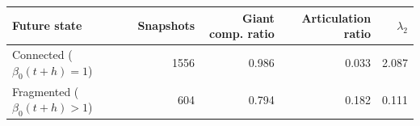 \begin{tabular}{lrrrr}
\toprule
Future state & Snapshots & Giant comp. ratio & Articulation ratio & $\lambda_2$ \\
\midrule
Connected ($\beta_0(t+h)=1$) & 1556 & 0.986 & 0.033 & 2.087 \\
Fragmented ($\beta_0(t+h)>1$) & 604 & 0.794 & 0.182 & 0.111 \\
\bottomrule
\end{tabular}
